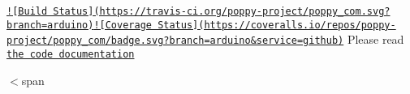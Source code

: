 \href{https://travis-ci.org/poppy-project/poppy_com}{\tt !\mbox{[}Build Status\mbox{]}(https\-://travis-\/ci.\-org/poppy-\/project/poppy\-\_\-com.\-svg?branch=arduino)}\href{https://coveralls.io/github/poppy-project/poppy_com?branch=arduino}{\tt !\mbox{[}Coverage Status\mbox{]}(https\-://coveralls.\-io/repos/poppy-\/project/poppy\-\_\-com/badge.\-svg?branch=arduino\&service=github)} Please read \href{http://poppy-project.github.io/poppy_com/}{\tt the code documentation}

$<$span 